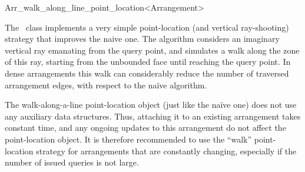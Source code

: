 
\ccRefPageBegin

\begin{ccRefClass}{Arr_walk_along_line_point_location<Arrangement>}
\label{arr_ref:walk_pl}

\ccDefinition

The \ccRefName\ class implements a very simple point-location (and 
vertical ray-shooting) strategy that improves the naive one.
The algorithm considers an imaginary vertical ray emanating from the
query point, and simulates a walk along the zone of this ray, starting
from the unbounded face until reaching the query point.
In dense arrangements this walk can considerably reduce the number
of traversed arrangement edges, with respect to the na\"{i}ve
algorithm.

The walk-along-a-line point-location object (just like the na\"{i}ve one)
does not use any auxiliary data structures. Thus, attaching it to an
existing arrangement takes constant time, and any ongoing updates to
this arrangement do not affect the point-location object.
It is therefore recommended to use the ``walk'' point-location strategy
for arrangements that are constantly changing, especially if the number
of issued queries is not large.


\ccIsModel
   \\

\end{ccRefClass}

\ccRefPageEnd
